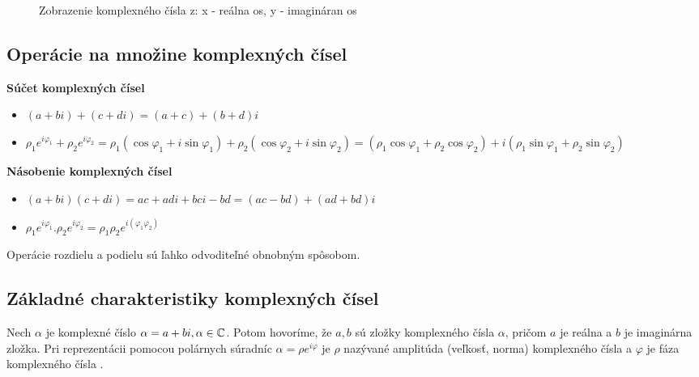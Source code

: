 \begin{figure}
\centering
{}
\caption{Zobrazenie komplexného čísla z: x - reálna os, y - imagináran os}
\label{fig:kn}
\end{figure}

\subsection{Operácie na množine komplexných čísel}
\textbf{Súčet komplexných čísel}
\begin{itemize}
\item \((a + bi) + (c + di) = (a + c) + (b + d)i\)
\item \(\rho_{1}e^{i \varphi_{1}} + \rho_{2}e^{i \varphi_{2}} = \rho_{1}(\cos \varphi_{1} + i\sin \varphi_{1}) + \rho_{2}(\cos \varphi_{2} + i\sin \varphi_{2}) =  (\rho_{1}\cos \varphi_{1} + \rho_{2}\cos \varphi_{2}) + i(\rho_{1}\sin \varphi_{1} + \rho_{2}\sin \varphi_{2})\)
\end{itemize}

\textbf{Násobenie komplexných čísel}
\begin{itemize}
\item \((a + bi)(c + di) = ac + adi + bci - bd = (ac - bd) + (ad + bd)i\)
\item \(\rho_{1}e^{i \varphi_{1}} . \rho_{2}e^{i \varphi_{2}} = \rho_{1} \rho_{2}e^{i(\varphi_{1} \varphi_{2})}\)
\end{itemize}

Operácie rozdielu a podielu sú ľahko odvoditeľné obnobným spôsobom.

\subsection{Základné charakteristiky komplexných čísel}
Nech \(\alpha\) je komplexné číslo \(\alpha = a + bi, \alpha \in \mathbb{C}\).
Potom hovoríme, že \(a,b\) sú zložky komplexného čísla \(\alpha\), pričom \(a\) je reálna a \(b\) je imaginárna zložka.
Pri reprezentácii pomocou polárnych súradníc \(\alpha = \rho e^{i\varphi}\) je \(\rho\) nazývané amplitúda (veľkosť, norma) komplexného čísla a \(\varphi\) je fáza komplexného čísla \cite{Rich07}. \\

